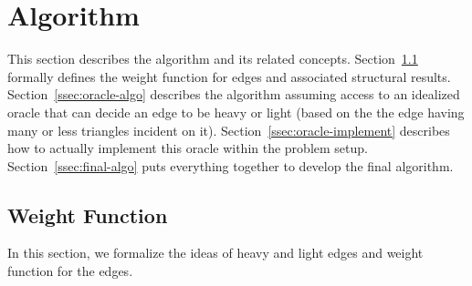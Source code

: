 \section{Algorithm}
\label{sec:algo}

This section describes the algorithm and its related concepts. Section~\ref{ssec:weightfunc} formally defines the weight function for edges and associated structural results. Section~\ref{ssec:oracle-algo} describes the algorithm assuming access to an idealized oracle that can decide an edge to be heavy or light (based on the the edge having many or less triangles incident on it). Section~\ref{ssec:oracle-implement} describes how to actually implement this oracle within the problem setup. Section~\ref{ssec:final-algo} puts everything together to develop the final algorithm.























\subsection{Weight Function}
\label{ssec:weightfunc}
In this section, we formalize the ideas of heavy and light edges and weight function for the edges. 
